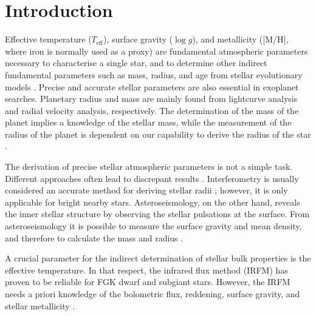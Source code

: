 \documentclass{aa}
\begin{document}
\maketitle



\section{Introduction}
\label{sec:introduction}

Effective temperature ($T_\mathrm{eff}$), surface gravity ($\log g$),
and metallicity ([M/H], where iron is normally used as a proxy)
are fundamental atmospheric parameters necessary to characterise a single
star, and to determine other indirect fundamental parameters
such as mass, radius, and age from stellar evolutionary models
\citep[see e.g.][]{Girardi2000,Dotter2008,Baraffe2015}.
Precise and accurate stellar parameters are also essential in
exoplanet searches. Planetary radius and mass are mainly found from
lightcurve analysis and radial velocity analysis, respectively. The
determination of the mass of the planet implies a knowledge of the
stellar mass, while the measurement of the radius of the planet
is dependent on our capability to derive the radius of the star
\citep[see e.g.][]{Torres2008,Ammler2009,Torres2012}.

The derivation of precise stellar atmospheric parameters is not a simple task.
Different approaches often lead to discrepant results
\citep[see e.g.][]{Santos13}. Interferometry is usually considered  an accurate
method for deriving stellar radii \citep[e.g.][]{Boyajian2012}; however, it is
only applicable for bright nearby stars. Asteroseismology, on the other hand,
reveals the inner stellar structure by observing the stellar pulsations at the
surface. From asteroseismology it is possible to measure the surface gravity and
mean density, and therefore to calculate the mass and radius
\citep[e.g.][]{Kjeldsen1995}.

A crucial parameter for the indirect determination of stellar bulk
properties is the effective temperature. In that respect, the infrared
flux method (IRFM) has proven to be reliable for FGK dwarf and
subgiant stars. However, the IRFM needs a priori knowledge of the
bolometric flux, reddening, surface gravity, and stellar metallicity
\citep{Blackwell1977,Ramirez2005b,Casagrande2010}.
\end{document}
